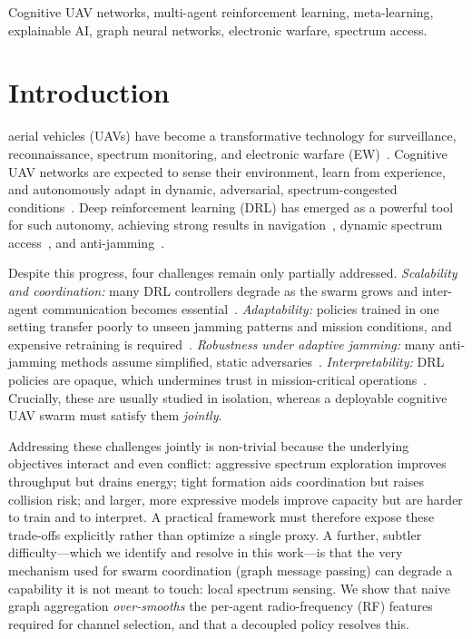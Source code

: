 \documentclass[journal]{IEEEtran}
\begin{document}
\begin{IEEEkeywords}
Cognitive UAV networks, multi-agent reinforcement learning, meta-learning,
explainable AI, graph neural networks, electronic warfare, spectrum access.
\end{IEEEkeywords}

\section{Introduction}
 aerial vehicles (UAVs) have become a transformative
technology for surveillance, reconnaissance, spectrum monitoring, and electronic
warfare (EW)~\cite{choi2023modular,xu2023pursuing}. Cognitive UAV networks are
expected to sense their environment, learn from experience, and autonomously
adapt in dynamic, adversarial, spectrum-congested conditions~\cite{jiang2022multiagent}.
Deep reinforcement learning (DRL) has emerged as a powerful tool for such
autonomy, achieving strong results in navigation~\cite{choi2023modular,xu2023multiuav},
dynamic spectrum access~\cite{dong2022dynamic,wang2022usage}, and
anti-jamming~\cite{zheng2022airborne,chen2022distributed}.

Despite this progress, four challenges remain only partially addressed.
\emph{Scalability and coordination:} many DRL controllers degrade as the swarm
grows and inter-agent communication becomes essential~\cite{liu2023task}.
\emph{Adaptability:} policies trained in one setting transfer poorly to unseen
jamming patterns and mission conditions, and expensive retraining is
required~\cite{hieu2022transferable}. \emph{Robustness under adaptive jamming:}
many anti-jamming methods assume simplified, static adversaries~\cite{chen2022distributed}.
\emph{Interpretability:} DRL policies are opaque, which undermines trust in
mission-critical operations~\cite{lundberg2017unified}. Crucially, these are
usually studied in isolation, whereas a deployable cognitive UAV swarm must
satisfy them \emph{jointly}.

Addressing these challenges jointly is non-trivial because the underlying
objectives interact and even conflict: aggressive spectrum exploration improves
throughput but drains energy; tight formation aids coordination but raises
collision risk; and larger, more expressive models improve capacity but are
harder to train and to interpret. A practical framework must therefore expose
these trade-offs explicitly rather than optimize a single proxy. A further,
subtler difficulty---which we identify and resolve in this work---is that the
very mechanism used for swarm coordination (graph message passing) can degrade a
capability it is not meant to touch: local spectrum sensing. We show that naive
graph aggregation \emph{over-smooths} the per-agent radio-frequency (RF) features
required for channel selection, and that a decoupled policy resolves this.
\end{document}
